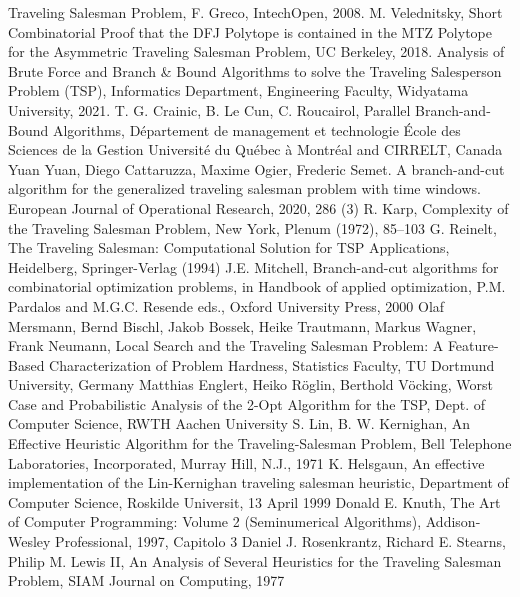 \documentclass[a4paper,12pt]{report}
\begin{document}
\begin{thebibliography}{00}
Traveling Salesman Problem, F. Greco, IntechOpen, 2008.
M. Velednitsky, Short Combinatorial Proof that the DFJ Polytope is contained in
the MTZ Polytope for the Asymmetric Traveling Salesman Problem, UC Berkeley, 2018.
%
Analysis of Brute Force and Branch \& Bound Algorithms to solve the Traveling
Salesperson Problem (TSP), Informatics Department, Engineering Faculty, Widyatama University, 2021.
%
T. G. Crainic, B. Le Cun, C. Roucairol, Parallel Branch-and-Bound Algorithms, Département de management et technologie École des Sciences de la Gestion Université du Québec à Montréal and CIRRELT, Canada
Yuan Yuan, Diego Cattaruzza, Maxime Ogier, Frederic Semet. A branch-and-cut algorithm for the generalized traveling salesman problem with time windows. European Journal of Operational Research, 2020, 286 (3)
%
R. Karp, Complexity of the Traveling Salesman Problem, New York, Plenum (1972), 85–103
%
G. Reinelt, The Traveling Salesman: Computational Solution for TSP Applications, Heidelberg, Springer-Verlag (1994)
J.E. Mitchell, Branch-and-cut algorithms for combinatorial
optimization problems, in Handbook of applied optimization, P.M.
Pardalos and M.G.C. Resende eds., Oxford University Press, 2000
Olaf Mersmann, Bernd Bischl, Jakob Bossek, Heike Trautmann, Markus Wagner, Frank Neumann, Local Search and the Traveling Salesman Problem: A Feature-Based Characterization of Problem Hardness, Statistics Faculty, TU Dortmund University, Germany
Matthias Englert, Heiko Röglin, Berthold Vöcking, Worst Case and Probabilistic Analysis 
of the 2-Opt Algorithm for the TSP, Dept. of Computer Science, RWTH Aachen University
S. Lin, B. W. Kernighan, An Effective Heuristic Algorithm for the Traveling-Salesman Problem, Bell Telephone Laboratories, Incorporated, Murray Hill, N.J., 1971
K. Helsgaun, An effective implementation of the Lin-Kernighan traveling
salesman heuristic, Department of Computer Science, Roskilde Universit, 13 April 1999
Donald E. Knuth, The Art of Computer Programming: Volume 2 (Seminumerical Algorithms), Addison-Wesley Professional, 1997, Capitolo 3
Daniel J. Rosenkrantz, Richard E. Stearns, Philip M. Lewis II, An Analysis of Several Heuristics for the Traveling Salesman Problem, SIAM Journal on Computing, 1977

\end{thebibliography}
\end{document}
